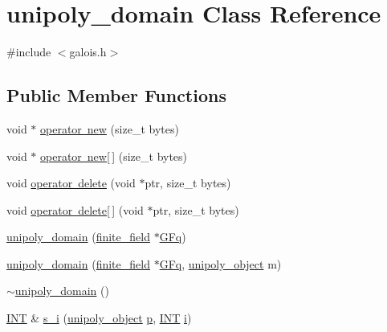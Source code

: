 \hypertarget{classunipoly__domain}{}\section{unipoly\+\_\+domain Class Reference}
\label{classunipoly__domain}


{\ttfamily \#include $<$galois.\+h$>$}

\subsection*{Public Member Functions}
\begin{DoxyCompactItemize}
\item 
void $\ast$ \mbox{\hyperlink{classunipoly__domain_ac14a6bbdd4f6f5ad85b263c608b1299e}{operator new}} (size\+\_\+t bytes)
\item 
void $\ast$ \mbox{\hyperlink{classunipoly__domain_a386bac084ce39f22402bf8a5c2b90917}{operator new\mbox{[}$\,$\mbox{]}}} (size\+\_\+t bytes)
\item 
void \mbox{\hyperlink{classunipoly__domain_a77df7f8c647d78cc7914d4a54cee42a3}{operator delete}} (void $\ast$ptr, size\+\_\+t bytes)
\item 
void \mbox{\hyperlink{classunipoly__domain_a4850c668b764fa9ad3f9f665709ea0ca}{operator delete\mbox{[}$\,$\mbox{]}}} (void $\ast$ptr, size\+\_\+t bytes)
\item 
\mbox{\hyperlink{classunipoly__domain_af4d5e783d5f52d5475c4db64ef7d8071}{unipoly\+\_\+domain}} (\mbox{\hyperlink{classfinite__field}{finite\+\_\+field}} $\ast$\mbox{\hyperlink{discreta_8h_a3fcb7d3694a4550768d8b965fefd32eba6e13c8ed7fe701ffc7ff39e732eb6271}{G\+Fq}})
\item 
\mbox{\hyperlink{classunipoly__domain_a4f985c5bd69071f5116acf266733efb4}{unipoly\+\_\+domain}} (\mbox{\hyperlink{classfinite__field}{finite\+\_\+field}} $\ast$\mbox{\hyperlink{discreta_8h_a3fcb7d3694a4550768d8b965fefd32eba6e13c8ed7fe701ffc7ff39e732eb6271}{G\+Fq}}, \mbox{\hyperlink{galois_8h_a77ca58de3d2da6172242493dd9c8aaa8}{unipoly\+\_\+object}} m)
\item 
\mbox{\hyperlink{classunipoly__domain_a37c0a454e307c2fdb6e5309b8ecf3642}{$\sim$unipoly\+\_\+domain}} ()
\item 
\mbox{\hyperlink{galois_8h_a09fddde158a3a20bd2dcadb609de11dc}{I\+NT}} \& \mbox{\hyperlink{classunipoly__domain_a6c1453cb6071017f1cdd513ca86c66c4}{s\+\_\+i}} (\mbox{\hyperlink{galois_8h_a77ca58de3d2da6172242493dd9c8aaa8}{unipoly\+\_\+object}} \mbox{\hyperlink{alphabet2_8_c_a533391314665d6bf1b5575e9a9cd8552}{p}}, \mbox{\hyperlink{galois_8h_a09fddde158a3a20bd2dcadb609de11dc}{I\+NT}} \mbox{\hyperlink{alphabet2_8_c_acb559820d9ca11295b4500f179ef6392}{i}})

\end{DoxyCompactItemize}
